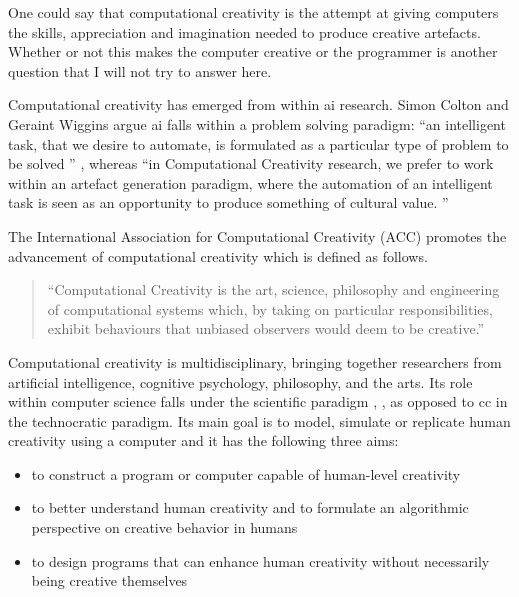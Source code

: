 \begin{draft}
  One could say that computational creativity is the attempt at giving computers the skills, appreciation and imagination needed to produce creative artefacts. Whether or not this makes the computer creative or the programmer is another question that I will not try to answer here.
\end{draft}

Computational creativity has emerged from within \gls{ai} research. Simon Colton and Geraint Wiggins argue \gls{ai} falls within a problem solving paradigm: ``an intelligent task, that we desire to automate, is formulated as a particular type of problem to be solved '' \autocite[p.2]{Colton2012}, whereas ``in Computational Creativity research, we prefer to work within an artefact generation paradigm, where the automation of an intelligent task is seen as an opportunity to produce something of cultural value. '' \autocite[p.2, my emphasis]{Colton2012}

The International Association for Computational Creativity (ACC)  promotes the advancement of computational creativity which is defined as follows.

\begin{quotation}
  ``Computational Creativity is the art, science, philosophy and engineering of computational systems which, by taking on particular responsibilities, exhibit behaviours that unbiased observers would deem to be creative.'' 
\end{quotation}

Computational creativity is multidisciplinary, bringing together researchers from artificial intelligence, cognitive psychology, philosophy, and the arts. Its role within computer science falls under the scientific paradigm \autocite[p.8]{Hugill2013}, \autocite[see also][]{Eden2007}, as opposed to \gls{cc} in the technocratic paradigm. Its main goal is to model, simulate or replicate human creativity using a computer and it has the following three aims:

\begin{itemize}
  \item to construct a program or computer capable of human-level creativity
  \item to better understand human creativity and to formulate an algorithmic perspective on creative behavior in humans
  \item to design programs that can enhance human creativity without necessarily being creative themselves
\end{itemize}

